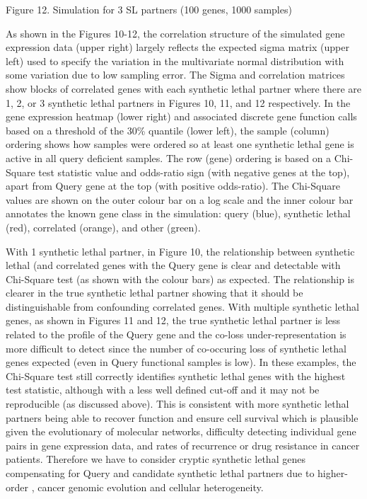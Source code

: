 Figure 12.  Simulation for 3 SL partners (100 genes, 1000 samples)

As shown in the Figures 10-12, the correlation structure of the simulated \gls{gene expression} data (upper right) largely reflects the expected sigma matrix (upper left) used to specify the variation in the multivariate normal distribution with some variation due to low sampling error.  The Sigma and correlation matrices show blocks of correlated genes with each \gls{synthetic lethal} partner where there are 1, 2, or 3 \gls{synthetic lethal} partners in Figures 10, 11, and 12 respectively.  In the \gls{gene expression} heatmap (lower right) and associated discrete gene function calls based on a threshold of the 30\% quantile (lower left), the sample (column) ordering shows how samples were ordered so at least one \gls{synthetic lethal} gene is active in all query deficient samples.  The row (gene) ordering is based on a Chi-Square test statistic value and odds-ratio sign (with negative genes at the top), apart from Query gene at the top (with positive odds-ratio).  The Chi-Square values are shown on the outer colour bar on a log scale and the inner colour bar annotates the known gene class in the simulation: query (blue), \gls{synthetic lethal} (red), correlated (orange), and other (green).

With 1 \gls{synthetic lethal} partner, in Figure 10, the relationship between \gls{synthetic lethal} (and correlated genes with the Query gene is clear and detectable with Chi-Square test (as shown with the colour bars) as expected.  The relationship is clearer in the true \gls{synthetic lethal} partner showing that it should be distinguishable from confounding correlated genes.  With multiple \gls{synthetic lethal} genes, as shown in Figures 11 and 12, the true \gls{synthetic lethal} partner is less related to the  profile of the Query gene and the co-loss under-representation is more difficult to detect since the number of co-occuring loss of \gls{synthetic lethal} genes expected (even in Query functional samples is low).  In these examples, the Chi-Square test still correctly identifies \gls{synthetic lethal} genes with the highest test statistic, although with a less well defined cut-off and it may not be reproducible (as discussed above).  This is consistent with more \gls{synthetic lethal} partners being able to recover function and ensure cell survival which is plausible given the evolutionary  of molecular networks, difficulty detecting individual gene pairs in \gls{gene expression} data, and rates of recurrence or drug resistance in cancer patients.  Therefore we have to consider cryptic \gls{synthetic lethal} genes compensating for Query and candidate \gls{synthetic lethal} partners due to higher-order , cancer \gls{genomic} evolution and cellular heterogeneity.

